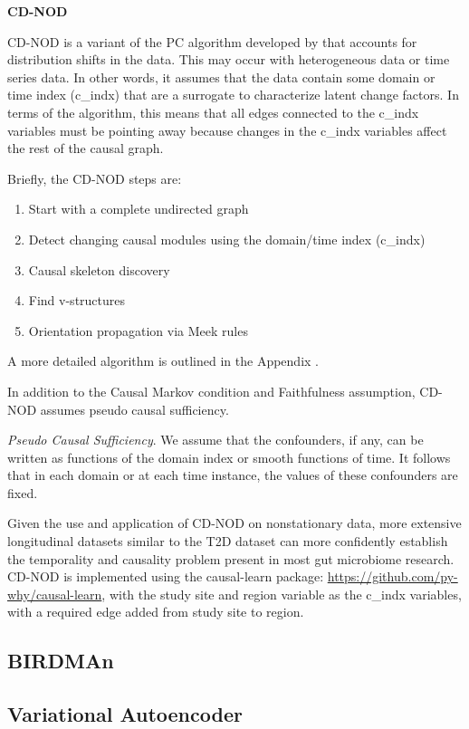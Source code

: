 \documentclass[12pt,letterpaper]{article}
\begin{document}
\textbf{CD-NOD}

CD-NOD is a variant of the PC algorithm developed by \citep{huang2019cdnod} that accounts for distribution shifts in the data. This may occur with heterogeneous data or time series data. In other words, it assumes that the data contain some domain or time index (c\_indx) that are a surrogate to characterize latent change factors. In terms of the algorithm, this means that all edges connected to the c\_indx variables must be pointing away because changes in the c\_indx variables affect the rest of the causal graph. 

Briefly, the CD-NOD steps are:
\begin{enumerate}
    \item Start with a complete undirected graph
    \item Detect changing causal modules using the domain/time index (c\_indx)
    \item Causal skeleton discovery
    \item Find v-structures
    \item Orientation propagation via Meek rules
\end{enumerate}

A more detailed algorithm is outlined in the Appendix \citep{huang2019cdnod}. 

In addition to the Causal Markov condition and Faithfulness assumption, CD-NOD assumes pseudo causal sufficiency.

\textit {Pseudo Causal Sufficiency}. We assume that the confounders, if any, can be written as functions of the domain index or smooth functions of time. It follows that in each domain or at each time instance, the values of these confounders are fixed. 

Given the use and application of CD-NOD on nonstationary data, more extensive longitudinal datasets similar to the T2D dataset can more confidently establish the temporality and causality problem present in most gut microbiome research. CD-NOD is implemented using the causal-learn package: \url{https://github.com/py-why/causal-learn}, with the study site and region variable as the c\_indx variables, with a required edge added from study site to region. 

\subsection{BIRDMAn}

\subsection{Variational Autoencoder} 
\end{document}
